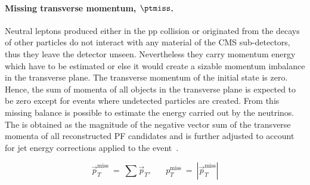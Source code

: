 \paragraph{Missing transverse momentum,
  $\boldsymbol{\ptmiss}$.}\label{sec:c2ptmiss}
Neutral leptons produced either in the pp collision or originated from
the decays of other particles do not interact with any material of the CMS
sub-detectors, thus they leave the detector unseen. Nevertheless they
carry momentum energy which have to be estimated or else it would
create a sizable momentum imbalance in the transverse plane. The
transverse momentum of the initial state is zero. Hence, the sum of 
momenta of all objects in the transverse plane is
expected to be zero except for events where undetected particles are
created. From this missing balance is possible to estimate the energy
carried out by the neutrinos. \\
The \ptmiss is obtained as the magnitude of the negative vector sum of the transverse momenta of 
all reconstructed PF candidates and is further adjusted to account for
jet energy corrections applied to the event~\cite{CMS-PAS-JME-16-004}.
\begin{linenomath}
  \begin{equation}
    \label{eq:c2ptmiss}
    \overrightarrow{p}_T^{\text{miss}} \: = \: \sum \overrightarrow{p}_T,
    \;\;\; \;\;\; p_T^{\text{miss}} \: = \: |\overrightarrow{p}_T^{\text{miss}}|
  \end{equation}
\end{linenomath}

